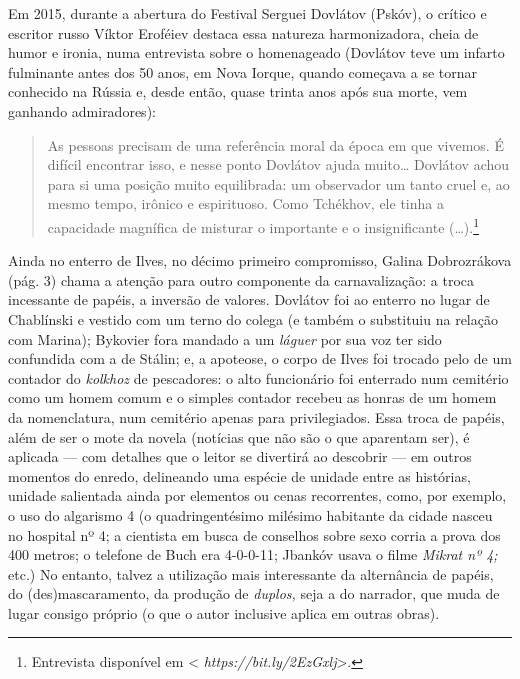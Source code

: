 Em 2015, durante a abertura do Festival Serguei Dovlátov (Pskóv), o
crítico e escritor russo Víktor Eroféiev destaca essa natureza
harmonizadora, cheia de humor e ironia, numa entrevista sobre o
homenageado (Dovlátov teve um infarto fulminante antes dos 50 anos, em
Nova Iorque, quando começava a se tornar conhecido na Rússia e, desde
então, quase trinta anos após sua morte, vem ganhando admiradores):

\begin{quotation}
As pessoas precisam de uma referência moral da época em que vivemos. É
difícil encontrar isso, e nesse ponto Dovlátov ajuda muito\ldots{} Dovlátov
achou para si uma posição muito equilibrada: um observador um tanto
cruel e, ao mesmo tempo, irônico e espirituoso. Como Tchékhov, ele tinha
a capacidade magnífica de misturar o importante e o insignificante
(\ldots{}).\footnote{Entrevista disponível em \textless{}
  \emph{https://bit.ly/2EzGxlj}\textgreater{}.}
\end{quotation}

\begin{center}
{}
\end{center}

Ainda no enterro de Ilves, no décimo primeiro compromisso, Galina
Dobrozrákova (pág. 3) chama a atenção para outro componente da
carnavalização: a troca incessante de papéis, a inversão de valores.
Dovlátov foi ao enterro no lugar de Chablínski e vestido com um terno do
colega (e também o substituiu na relação com Marina); Bykovier fora
mandado a um \emph{láguer} por sua voz ter sido confundida com a de
Stálin; e, a apoteose, o corpo de Ilves foi trocado pelo de um contador
do \emph{kolkhoz} de pescadores: o alto funcionário foi enterrado num
cemitério como um homem comum e o simples contador recebeu as honras de
um homem da nomenclatura, num cemitério apenas para privilegiados. Essa
troca de papéis, além de ser o mote da novela (notícias que não são o
que aparentam ser), é aplicada --- com detalhes que o leitor se
divertirá ao descobrir --- em outros momentos do enredo, delineando uma
espécie de unidade entre as histórias, unidade salientada ainda por
elementos ou cenas recorrentes, como, por exemplo, o uso do algarismo 4
(o quadringentésimo milésimo habitante da cidade nasceu no hospital nº
4; a cientista em busca de conselhos sobre sexo corria a prova dos 400
metros; o telefone de Buch era 4-0-0-11; Jbankóv usava o filme
\emph{Mikrat nº 4;} etc.) No entanto, talvez a utilização mais
interessante da alternância de papéis, do (des)mascaramento, da produção de
\emph{duplos,} seja a do narrador, que muda de lugar consigo próprio (o
que o autor inclusive aplica em outras obras).

